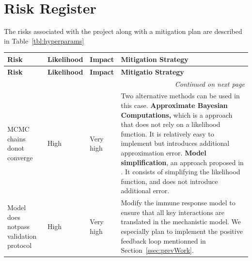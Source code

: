 \documentclass[11pt]{article}
\begin{document}
\section{Risk Register}
The risks associated with the project along with a mitigation plan are described in Table~\ref{tbl:hyperparams}

\begin{table}[!ht]
    \caption{Table of the different risks associated with the project's objectives}

    \label{tbl:hyperparams}
\begin{longtable}{|p{3.5cm}|p{2.3cm}|p{2.3cm}|p{8cm}|}
    \hline
    \textbf{Risk} & \textbf{Likelihood} & \textbf{Impact} & \textbf{Mitigation Strategy}\\
    \hline
    \endfirsthead
    \hline
    \textbf{Risk} & \textbf{Likelihood} & \textbf{Impact} & \textbf{Mitigatio Strategy}\\
    \hline
    \endhead
    \hline
    \multicolumn{4}{|r|}{\textit{Continued on next page}} \\
    \hline
    \endfoot
    \hline
\endlastfoot
        \hline
        MCMC chains do\newline not converge  & High & Very high & 
        Two alternative methods can be used in this case.
        \textbf{Approximate Bayesian Computations,} which is a approach that does not rely on a likelihood function. It is relatively easy to implement but introduces additional approximation error. \textbf{Model simplification}, an approach proposed in \cite{gelman2020bayesian}. It consists of simplifying the likelihood function, and does not introduce additional error.
        \\ \hline 
        Model does not\newline pass validation protocol& High & Very high & Modify the immune response model to ensure that all key interactions are translated in the mechanistic model. We especially plan to implement the positive feedback loop mentionned in Section~\ref{ssec:prevWork}. \\ \hline 
\end{longtable}
\end{table}
\end{document}
